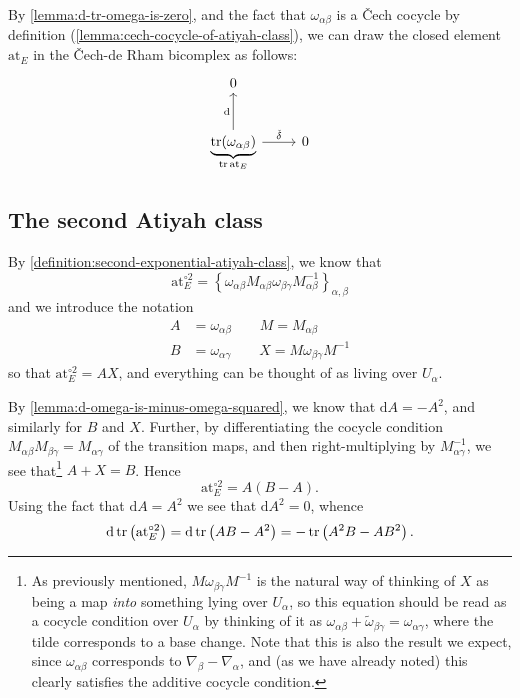 \documentclass[11pt,fleqn]{article}
\theoremstyle{plain}
\theoremstyle{definition}
\theoremstyle{remark}
\numberwithin{equation}{theorem}
\newcommand{\at}{\mathrm{at}}
\newcommand{\expat}[1]{\at^{\circ#1}}
\renewcommand{\d}{\mathrm{d}}
\begin{document}
        By \cref{lemma:d-tr-omega-is-zero}, and the fact that $\omega_{\alpha\beta}$ is a Čech cocycle by definition (\cref{lemma:cech-cocycle-of-atiyah-class}), we can draw the closed element $\at_E$ in the Čech-de Rham bicomplex as follows:
        \begin{equation}
            \begin{tikzcd}[row sep=large]
                0&\\
                \underbrace{\tr(\omega_{\alpha\beta})}_{\tr\at_E}
                    \ar[u,"\mathrm{d}"]
                    \ar[r,"\check\delta"]
                & 0
            \end{tikzcd}
        \end{equation}


    \subsection{The second Atiyah class}\label{subsection:second-manual-atiyah-class}

        By \cref{definition:second-exponential-atiyah-class}, we know that
        \begin{equation*}
            \expat{2}_E = \left\{\omega_{\alpha\beta}M_{\alpha\beta}\omega_{\beta\gamma}M_{\alpha\beta}^{-1}\right\}_{\alpha,\beta}
        \end{equation*}
        and we introduce the notation
        \begin{align*}
                A &= \omega_{\alpha\beta}
                \qquad
                M = M_{\alpha\beta}
            \\  B &= \omega_{\alpha\gamma}
                \qquad
                X = M\omega_{\beta\gamma}M^{-1}
        \end{align*}
        so that $\expat{2}_E=AX$, and everything can be thought of as living over $U_\alpha$.

        By \cref{lemma:d-omega-is-minus-omega-squared}, we know that $\mathrm{d}A = -A^2$, and similarly for $B$ and $X$.
        Further, by differentiating the cocycle condition $M_{\alpha\beta}M_{\beta\gamma} = M_{\alpha\gamma}$ of the transition maps, and then right-multiplying by $M_{\alpha\gamma}^{-1}$, we see that\footnote{As previously mentioned, $M\omega_{\beta\gamma}M^{-1}$ is the natural way of thinking of $X$ as being a map \textit{into} something lying over $U_\alpha$, so this equation should be read as a cocycle condition over $U_\alpha$ by thinking of it as $\omega_{\alpha\beta}+\widetilde{\omega}_{\beta\gamma}=\omega_{\alpha\gamma}$, where the tilde corresponds to a base change. Note that this is also the result we expect, since $\omega_{\alpha\beta}$ corresponds to $\nabla_\beta-\nabla_\alpha$, and (as we have already noted) this clearly satisfies the additive cocycle condition.} \mbox{$A+X=B$}.
        Hence
        \begin{equation*}
            \expat{2}_E = A(B-A).
        \end{equation*}
        Using the fact that $\d A=A^2$ we see that $\d A^2=0$, whence
        \[
            \d\tr\left(\expat{2}_E\right) = \d\tr\left(AB-A^2\right) = -\tr\left(A^2B-AB^2\right).
        \]
\end{document}
